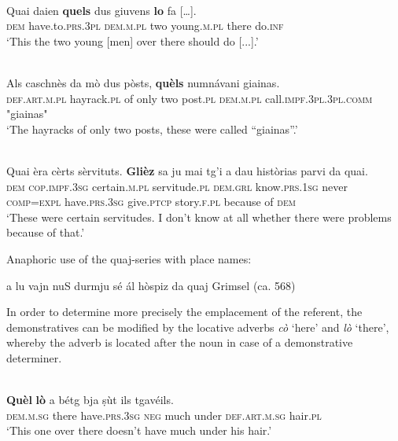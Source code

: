 {\ea\label{ex:}
\\
\gll Quai daien \textbf{quels} dus giuvens \textbf{lo} fa […].\\
    \textsc{dem} have.to.\textsc{prs.3pl} \textsc{dem.m.pl} two young.\textsc{m.pl} there do.\textsc{inf}\\
\glt `This the two young [men] over there should do [...].'
\z

\ea\label{}
\\
\gll   Als caschnès da mò dus pòsts, \textbf{quèls} numnávani giainas.\\
     \textsc{def.art.m.pl} hayrack.\textsc{pl} of only two post.\textsc{pl} \textsc{dem.m.pl} call.\textsc{impf.3pl.3pl.comm} "giainas"\\
\glt `The hayracks of only two posts, these were called “giainas”.'
\z

\ea\label{}
\\
\gll  Quai èra cèrts sèrvituts. \textbf{Glièz} sa ju mai tg’i a dau històrias parvi da quai. \\
    \textsc{dem} \textsc{cop.impf.3sg} certain.\textsc{m.pl} servitude.\textsc{pl} \textsc{dem.grl} know.\textsc{prs.1sg} never \textsc{comp=expl} have.\textsc{prs.3sg} give.\textsc{ptcp} story.\textsc{f.pl} because of \textsc{dem} \\
\glt `These were certain servitudes. I don’t know at all whether there were problems because of that.'
\z

Anaphoric use of the quaj-series with place names:

a lu vajn nuS durmju sé ál hòspiz da quaj Grimsel (ca. 568)


In order to determine more precisely the emplacement of the referent, the demonstratives can be modified by the locative adverbs \textit{cò} `here' and \textit{lò} `there', whereby the adverb is located after the noun in case of a demonstrative determiner.

\ea\label{}
\\
\gll   \textbf{Quèl} \textbf{lò} a bétg bja ṣùt ils tgavéils.\\
     \textsc{dem.m.sg} there have.\textsc{prs.3sg} \textsc{neg} much under \textsc{def.art.m.sg} hair.\textsc{pl}\\
\glt `This one over there doesn't have much under his hair.'
\z



}
